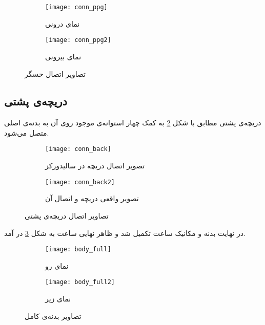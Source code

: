 \begin{figure}[h]
	\centering
	\begin{subfigure}{0.405\textwidth}
		\centering
		\texttt{[image: conn\_ppg]}
		\caption{نمای درونی}
	\end{subfigure} 
	\begin{subfigure}{0.4\textwidth}
		\centering
		\texttt{[image: conn\_ppg2]}
		\caption{نمای بیرونی}
	\end{subfigure}
	\caption{تصاویر اتصال حسگر }
	\label{fig:conn-ppg}
\end{figure}

\subsection{دریچه‌ی پشتی}
دریچه‌ی پشتی مطابق با شکل \ref{fig:conn-back} به کمک چهار استوانه‌ی موجود روی آن به بدنه‌ی اصلی متصل می‌شود.

	\begin{figure}[h]
		\centering
		\begin{subfigure}{0.5\textwidth}
			\centering
			\texttt{[image: conn\_back]}
			\caption{تصویر اتصال دریچه در سالیدورکز}
		\end{subfigure} 
		\begin{subfigure}{0.4\textwidth}
			\centering
			\texttt{[image: conn\_back2]}
			\caption{تصویر واقعی دریچه و اتصال آن}
		\end{subfigure}
		\caption{تصاویر اتصال دریچه‌ی پشتی}
		\label{fig:conn-back}
	\end{figure}

در نهایت بدنه و مکانیک ساعت تکمیل شد و ظاهر نهایی ساعت به شکل \ref{fig:body-final} در آمد.

	\begin{figure}[h]
		\centering
		\begin{subfigure}{0.4\textwidth}
			\centering
			\texttt{[image: body\_full]}
			\caption{نمای رو}
		\end{subfigure} 
		\begin{subfigure}{0.4\textwidth}
			\centering
			\texttt{[image: body\_full2]}
			\caption{نمای زیر}
		\end{subfigure}
		\caption{تصاویر بدنه‌ی کامل}
		\label{fig:body-final}
	\end{figure}